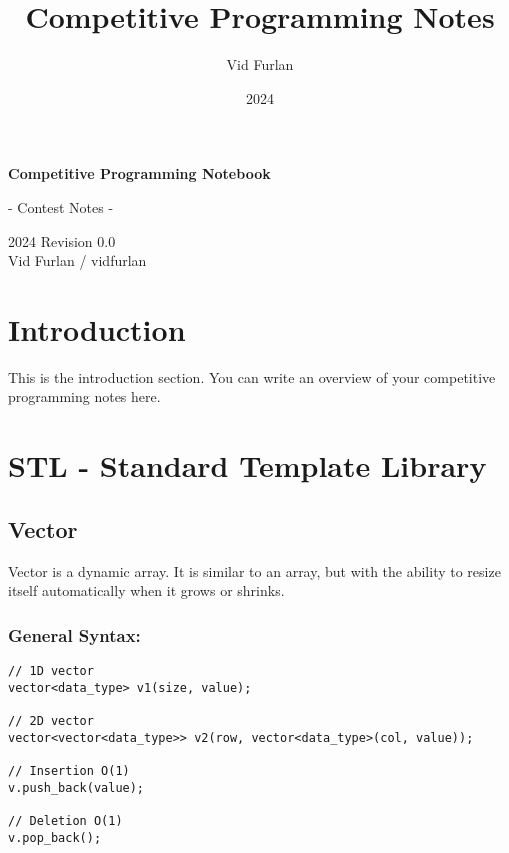 \documentclass{article}
\title{Competitive Programming Notes}
\author{Vid Furlan}
\date{2024}
\begin{document}
\begin{titlepage}
    \begin{center}
        \vspace*{4cm}
        
        \Huge
        \textbf{Competitive Programming Notebook}
        
        \vspace{0.5cm}
        \LARGE
        - Contest Notes -
        
        \vspace{1.5cm}
        
        2024 Revision 0.0\\
        \vspace{0.5cm}
        Vid Furlan / vidfurlan
    \end{center}
\end{titlepage}

\renewcommand{\contentsname}{\Large Index}
\tableofcontents
{}

\newpage

\section{Introduction}
This is the introduction section. You can write an overview of your competitive programming notes here.

\newpage

\section{STL - Standard Template Library}
\subsection{Vector}
Vector is a dynamic array. It is similar to an array, but with the ability to resize itself automatically when it grows or shrinks.

\subsubsection{General Syntax:}
\begin{verbatim}
// 1D vector
vector<data_type> v1(size, value);

// 2D vector
vector<vector<data_type>> v2(row, vector<data_type>(col, value));

// Insertion O(1)
v.push_back(value);

// Deletion O(1)
v.pop_back();
\end{verbatim}
\end{document}
